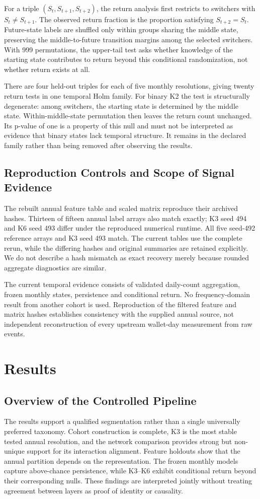 For a triple $(S_t,S_{t+1},S_{t+2})$, the return analysis first restricts to switchers with $S_t\ne S_{t+1}$. The observed return fraction is the proportion satisfying $S_{t+2}=S_t$. Future-state labels are shuffled only within groups sharing the middle state, preserving the middle-to-future transition margins among the selected switchers. With 999 permutations, the upper-tail test asks whether knowledge of the starting state contributes to return beyond this conditional randomization, not whether return exists at all.

There are four held-out triples for each of five monthly resolutions, giving twenty return tests in one temporal Holm family. For binary K2 the test is structurally degenerate: among switchers, the starting state is determined by the middle state. Within-middle-state permutation then leaves the return count unchanged. Its p-value of one is a property of this null and must not be interpreted as evidence that binary states lack temporal structure. It remains in the declared family rather than being removed after observing the results.

\subsection{Reproduction Controls and Scope of Signal Evidence}
The rebuilt annual feature table and scaled matrix reproduce their archived hashes. Thirteen of fifteen annual label arrays also match exactly; K3 seed 494 and K6 seed 493 differ under the reproduced numerical runtime. All five seed-492 reference arrays and K3 seed 493 match. The current tables use the complete rerun, while the differing hashes and original summaries are retained explicitly. We do not describe a hash mismatch as exact recovery merely because rounded aggregate diagnostics are similar.

The current temporal evidence consists of validated daily-count aggregation, frozen monthly states, persistence and conditional return. No frequency-domain result from another cohort is used. Reproduction of the filtered feature and matrix hashes establishes consistency with the supplied annual source, not independent reconstruction of every upstream wallet-day measurement from raw events.

\section{Results}
\subsection{Overview of the Controlled Pipeline}
The results support a qualified segmentation rather than a single universally preferred taxonomy. Cohort construction is complete, K3 is the most stable tested annual resolution, and the network comparison provides strong but non-unique support for its interaction alignment. Feature holdouts show that the annual partition depends on the representation. The frozen monthly models capture above-chance persistence, while K3--K6 exhibit conditional return beyond their corresponding nulls. These findings are interpreted jointly without treating agreement between layers as proof of identity or causality.

